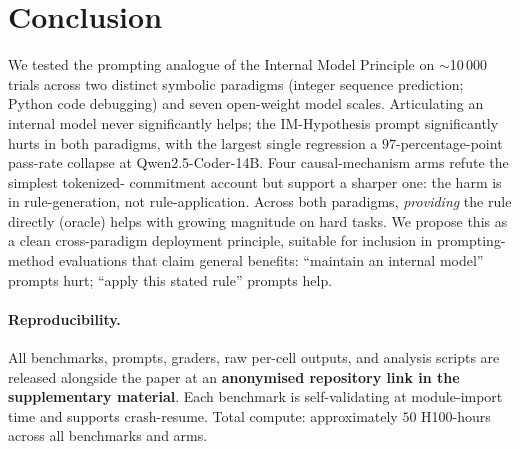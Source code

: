 \documentclass{article}
\begin{document}
\section{Conclusion}
\label{sec:conc}

We tested the prompting analogue of the Internal Model Principle
on $\sim$10\,000 trials across two distinct symbolic paradigms
(integer sequence prediction; Python code debugging) and seven
open-weight model scales.  Articulating an internal model never
significantly helps; the IM-Hypothesis prompt significantly
hurts in both paradigms, with the largest single regression a
$97$-percentage-point pass-rate collapse at Qwen2.5-Coder-14B.
Four causal-mechanism arms refute the simplest tokenized-
commitment account but support a sharper one:  the harm is in
rule-generation, not rule-application.  Across both paradigms,
\emph{providing} the rule directly (oracle) helps with growing
magnitude on hard tasks.  We propose this as a clean
cross-paradigm deployment principle, suitable for inclusion in
prompting-method evaluations that claim general benefits:
``maintain an internal model'' prompts hurt;  ``apply this
stated rule'' prompts help.

\paragraph{Reproducibility.}
All benchmarks, prompts, graders, raw per-cell outputs, and
analysis scripts are released alongside the paper at an
\textbf{anonymised repository link in the supplementary
material}.  Each benchmark is
self-validating at module-import time and supports
crash-resume.  Total compute: approximately $50$ H100-hours
across all benchmarks and arms.
\end{document}
